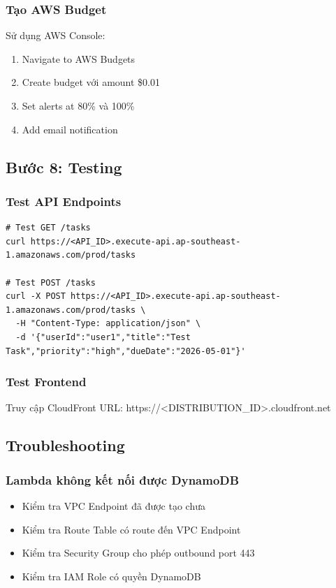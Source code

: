\subsubsection{Tạo AWS Budget}

Sử dụng AWS Console:
\begin{enumerate}
    \item Navigate to AWS Budgets
    \item Create budget với amount \$0.01
    \item Set alerts at 80\% và 100\%
    \item Add email notification
\end{enumerate}

\subsection{Bước 8: Testing}
\label{ssec:testing}

\subsubsection{Test API Endpoints}

\begin{verbatim}
# Test GET /tasks
curl https://<API_ID>.execute-api.ap-southeast-1.amazonaws.com/prod/tasks

# Test POST /tasks
curl -X POST https://<API_ID>.execute-api.ap-southeast-1.amazonaws.com/prod/tasks \
  -H "Content-Type: application/json" \
  -d '{"userId":"user1","title":"Test Task","priority":"high","dueDate":"2026-05-01"}'
\end{verbatim}

\subsubsection{Test Frontend}

Truy cập CloudFront URL: https://<DISTRIBUTION_ID>.cloudfront.net

\subsection{Troubleshooting}
\label{ssec:troubleshooting}

\subsubsection{Lambda không kết nối được DynamoDB}

\begin{itemize}
    \item Kiểm tra VPC Endpoint đã được tạo chưa
    \item Kiểm tra Route Table có route đến VPC Endpoint
    \item Kiểm tra Security Group cho phép outbound port 443
    \item Kiểm tra IAM Role có quyền DynamoDB
\end{itemize}

